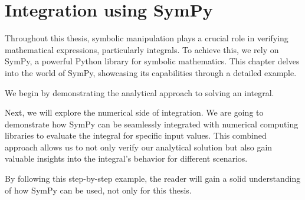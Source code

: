 \chapter{Integration using SymPy}\label{ch:intsympy}

Throughout this thesis, symbolic manipulation plays a crucial role in verifying mathematical expressions, particularly integrals.
To achieve this, we rely on SymPy\autocite{10.7717/peerj-cs.103}, a powerful Python library for symbolic mathematics.
This chapter delves into the world of SymPy\autocite{10.7717/peerj-cs.103}, showcasing its capabilities through a detailed example.

We begin by demonstrating the analytical approach to solving an integral.

Next, we will explore the numerical side of integration.
We are going to demonstrate how SymPy\autocite{10.7717/peerj-cs.103} can be seamlessly integrated with numerical computing libraries to evaluate the integral for specific input values.
This combined approach allows us to not only verify our analytical solution but also gain valuable insights into the integral's behavior for different scenarios.

By following this step-by-step example, the reader will gain a solid understanding of how SymPy\autocite{10.7717/peerj-cs.103} can be used, not only for this thesis.




